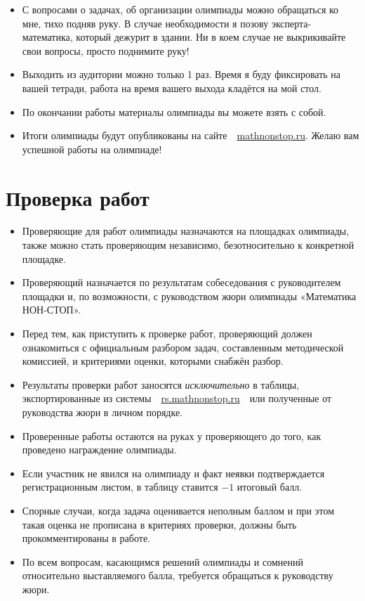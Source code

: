 \documentclass[a4paper,12pt]{article}
\newcommand{\mns}{«Математика НОН-СТОП»\xspace}
\begin{document}
\begin{itemize}
	\item С вопросами о задачах, об организации олимпиады можно обращаться ко мне, тихо подняв руку. В случае необходимости я позову эксперта-математика, который дежурит в здании.  Ни в коем случае не выкрикивайте свои вопросы, просто поднимите руку!
	\item Выходить из аудитории можно только 1 раз. Время я буду фиксировать на вашей тетради, работа на время вашего выхода кладётся на мой стол.
	\item По окончании работы материалы олимпиады вы можете взять с собой.
	\item Итоги олимпиады будут опубликованы на сайте\ \ \url{mathnonstop.ru}. Желаю вам успешной работы на олимпиаде!
\end{itemize}

\section{Проверка работ}

\begin{itemize}
	\item Проверяющие для работ олимпиады назначаются на площадках олимпиады, также можно стать проверяющим независимо, безотносительно к конкретной площадке.
	\item Проверяющий назначается по результатам собеседования с руководителем площадки и, по возможности, с руководством жюри олимпиады \mns.
	\item Перед тем, как приступить к проверке работ, проверяющий должен ознакомиться с официальным разбором задач, составленным методической комиссией, и критериями оценки, которыми снабжён разбор.
	\item Результаты проверки работ заносятся {\it исключительно} в таблицы, экспортированные из системы\ \ \url{rs.mathnonstop.ru}\ \ или полученные от руководства жюри в личном порядке.
	\item Проверенные работы остаются на руках у проверяющего до того, как проведено награждение олимпиады.
	\item Если участник не явился на олимпиаду и факт неявки подтверждается регистрационным листом, в таблицу ставится $-1$ итоговый балл.
	\item Спорные случаи, когда задача оценивается неполным баллом и при этом такая оценка не прописана в критериях проверки, должны быть прокомментированы в работе.
	\item По всем вопросам, касающимся решений олимпиады и сомнений относительно выставляемого балла, требуется обращаться к руководству жюри.
\end{itemize}
\end{document}
